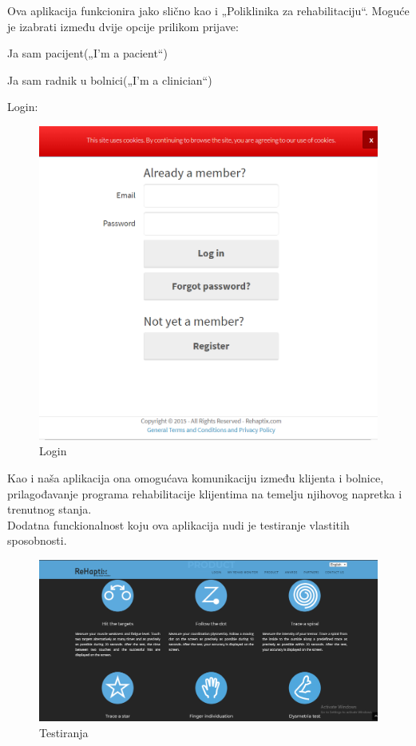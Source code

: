 	Ova aplikacija funkcionira jako slično kao i „Poliklinika za rehabilitaciju“. Moguće je izabrati između dvije opcije prilikom prijave: 
	\begin{packed_item}
		\item {Ja sam pacijent(„I'm a pacient“)}
		\item {Ja sam radnik u bolnici(„I'm a clinician“)}
	\end{packed_item}

	\noindent \large{Login:}
		\begin{figure}[h]
			\centering
			\includegraphics[scale=0.3]{rehaptix2.png}
			\caption{Login}
		\end{figure}


	Kao i naša aplikacija ona omogućava komunikaciju između klijenta i bolnice, prilagođavanje programa rehabilitacije klijentima na temelju njihovog napretka i trenutnog stanja.\\
	Dodatna funckionalnost koju ova aplikacija nudi je testiranje vlastitih sposobnosti.\\
	
	\begin{figure}[h]
	\centering
	\includegraphics[scale=0.3]{rehaptix3.png}
	\caption{Testiranja}
	\end{figure}

